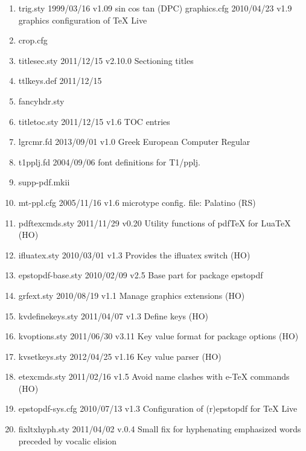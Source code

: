 \begin{enumerate}
\item trig.sty 1999/03/16 v1.09 sin cos tan (DPC)
graphics.cfg 2010/04/23 v1.9 graphics configuration of TeX Live
\item crop.cfg
\item titlesec.sty 2011/12/15 v2.10.0 Sectioning titles
\item ttlkeys.def 2011/12/15
\item fancyhdr.sty 
\item titletoc.sty 2011/12/15 v1.6 TOC entries
\item lgrcmr.fd 2013/09/01 v1.0 Greek European Computer Regular
\item t1pplj.fd 2004/09/06 font definitions for T1/pplj.
\item supp-pdf.mkii 
\item mt-ppl.cfg 2005/11/16 v1.6 microtype config. file: Palatino (RS)
\item pdftexcmds.sty 2011/11/29 v0.20 Utility functions of pdfTeX for LuaTeX (HO)
\item ifluatex.sty 2010/03/01 v1.3 Provides the ifluatex switch (HO)
\item epstopdf-base.sty 2010/02/09 v2.5 Base part for package epstopdf
\item grfext.sty 2010/08/19 v1.1 Manage graphics extensions (HO)
\item kvdefinekeys.sty 2011/04/07 v1.3 Define keys (HO)
\item kvoptions.sty 2011/06/30 v3.11 Key value format for package options (HO)
\item kvsetkeys.sty 2012/04/25 v1.16 Key value parser (HO)
\item etexcmds.sty 2011/02/16 v1.5 Avoid name clashes with e-TeX commands (HO)
\item epstopdf-sys.cfg 2010/07/13 v1.3 Configuration of (r)epstopdf for TeX Live
\item fixltxhyph.sty 2011/04/02 v.0.4 Small fix for hyphenating emphasized words preceded by vocalic elision
	\end{enumerate}